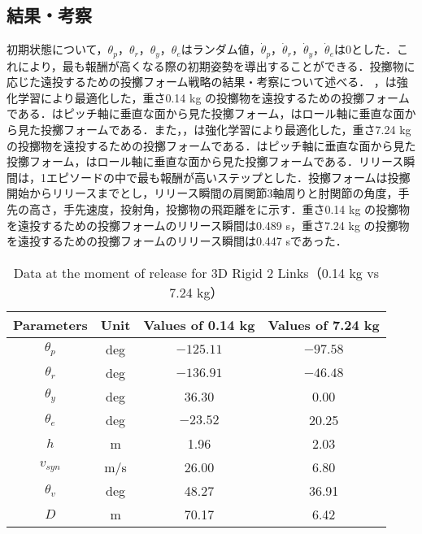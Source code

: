 \subsection{結果・考察}
初期状態について，$\theta_{p}$，$\theta_{r}$，$\theta_{y}$，$\theta_{e}$はランダム値，$\dot{\theta}_{p}$，$\dot{\theta}_{r}$，$\dot{\theta}_{y}$，$\dot{\theta}_{e}$は0とした．これにより，最も報酬が高くなる際の初期姿勢を導出することができる．投擲物に応じた遠投するための投擲フォーム戦略の結果・考察について述べる．
，は強化学習により最適化した，重さ0.14 kg の投擲物を遠投するための投擲フォームである．はピッチ軸に垂直な面から見た投擲フォーム，はロール軸に垂直な面から見た投擲フォームである．また，，は強化学習により最適化した，重さ7.24 kg の投擲物を遠投するための投擲フォームである．はピッチ軸に垂直な面から見た投擲フォーム，はロール軸に垂直な面から見た投擲フォームである．リリース瞬間は，1エピソードの中で最も報酬が高いステップとした．投擲フォームは投擲開始からリリースまでとし，リリース瞬間の肩関節3軸周りと肘関節の角度，手先の高さ，手先速度，投射角，投擲物の飛距離をに示す．重さ0.14 kg の投擲物を遠投するための投擲フォームのリリース瞬間は0.489 s，重さ7.24 kg の投擲物を遠投するための投擲フォームのリリース瞬間は0.447 sであった．

\begin{table}[tb]
  \begin{center}
    \caption{Data at the moment of release for 3D Rigid 2 Links（0.14 kg vs 7.24 kg）}
    \begin{tabular}{c|c|c|c}
      \hline
      Parameters & Unit & Values of 0.14 kg & Values of 7.24 kg \\
      \hline
      $\theta_{p}$ & deg & $-125.11$ & $-97.58$ \\
      $\theta_{r}$ & deg & $-136.91$ & $-46.48$ \\
      $\theta_{y}$ & deg  & 36.30 & 0.00 \\
      $\theta_{e}$ & deg & $-23.52$ & 20.25 \\
      $h$ & m & 1.96 & 2.03 \\
      $v_{syn}$ & m/s & 26.00 & 6.80 \\
      $\theta_{v}$ & deg & 48.27 & 36.91 \\
      $D$ & m & 70.17 & 6.42 \\
      \hline
    \end{tabular}
  \end{center}
\end{table}

